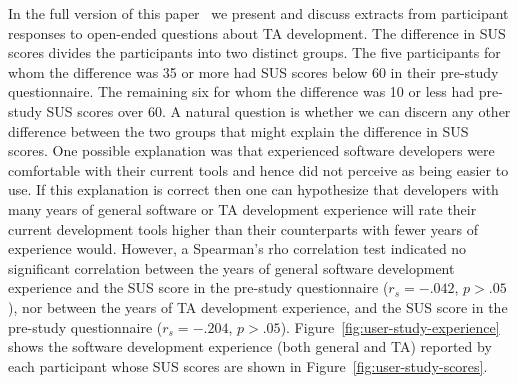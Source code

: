 \documentclass[10pt,conference,letterpaper]{IEEEtran}
\newif\ifabridged
\newcommand{\opentee}{\protect{TEE-Vi}\xspace}
\newcommand{\opentee}{\protect{Open-TEE}\xspace}
\begin{document}
\ifabridged
In the full version of this paper~\cite{MDNA15} we present and discuss
extracts from participant responses to open-ended questions about TA development.
\else
The difference in SUS scores divides the participants into two
distinct groups. The five participants for whom the difference was 35
or more had SUS scores below 60 in their pre-study questionnaire. The
remaining six for whom the difference was 10 or less had pre-study SUS
scores over 60. A natural question is whether we can discern any
other difference between the two groups that might explain the
difference in SUS scores. One possible explanation was that
experienced software developers were comfortable with their current
tools and hence did not perceive \opentee as being easier to use. If
this explanation is correct then one can hypothesize that developers
with many years of general software or TA development experience will
rate their current development tools higher than their counterparts
with fewer years of experience would. However, a Spearman's rho
correlation test indicated no significant correlation between the
years of general software development experience and the SUS score in
the pre-study questionnaire ($r_{s}=-.042$, $p>.05$), nor between the
years of TA development experience, and the SUS score in the pre-study
questionnaire ($r_{s}=-.204$, $p>.05$). 
Figure~\ref{fig:user-study-experience} shows the software
development experience (both general and TA) reported by each
participant whose SUS scores are shown in
Figure~\ref{fig:user-study-scores}. 
\end{document}
